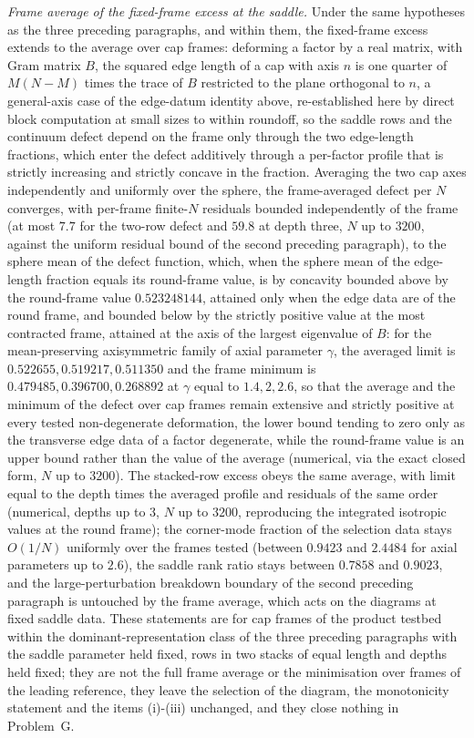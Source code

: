 \emph{Frame average of the fixed-frame excess at the saddle.} Under the same hypotheses as the three preceding paragraphs, and within them, the fixed-frame excess extends to the average over cap frames: deforming a factor by a real matrix, with Gram matrix \(B\), the squared edge length of a cap with axis \(n\) is one quarter of \(M(N-M)\) times the trace of \(B\) restricted to the plane orthogonal to \(n\), a general-axis case of the edge-datum identity above, re-established here by direct block computation at small sizes to within roundoff, so the saddle rows and the continuum defect depend on the frame only through the two edge-length fractions, which enter the defect additively through a per-factor profile that is strictly increasing and strictly concave in the fraction. Averaging the two cap axes independently and uniformly over the sphere, the frame-averaged defect per \(N\) converges, with per-frame finite-\(N\) residuals bounded independently of the frame (at most \(7.7\) for the two-row defect and \(59.8\) at depth three, \(N\) up to \(3200\), against the uniform residual bound of the second preceding paragraph), to the sphere mean of the defect function, which, when the sphere mean of the edge-length fraction equals its round-frame value, is by concavity bounded above by the round-frame value \(0.523248144\), attained only when the edge data are of the round frame, and bounded below by the strictly positive value at the most contracted frame, attained at the axis of the largest eigenvalue of \(B\): for the mean-preserving axisymmetric family of axial parameter \(\gamma\), the averaged limit is \(0.522655,0.519217,0.511350\) and the frame minimum is \(0.479485,0.396700,0.268892\) at \(\gamma\) equal to \(1.4,2,2.6\), so that the average and the minimum of the defect over cap frames remain extensive and strictly positive at every tested non-degenerate deformation, the lower bound tending to zero only as the transverse edge data of a factor degenerate, while the round-frame value is an upper bound rather than the value of the average (numerical, via the exact closed form, \(N\) up to \(3200\)). The stacked-row excess obeys the same average, with limit equal to the depth times the averaged profile and residuals of the same order (numerical, depths up to \(3\), \(N\) up to \(3200\), reproducing the integrated isotropic values at the round frame); the corner-mode fraction of the selection data stays \(O(1/N)\) uniformly over the frames tested (between \(0.9423\) and \(2.4484\) for axial parameters up to \(2.6\)), the saddle rank ratio stays between \(0.7858\) and \(0.9023\), and the large-perturbation breakdown boundary of the second preceding paragraph is untouched by the frame average, which acts on the diagrams at fixed saddle data. These statements are for cap frames of the product testbed within the dominant-representation class of the three preceding paragraphs with the saddle parameter held fixed, rows in two stacks of equal length and depths held fixed; they are not the full frame average or the minimisation over frames of the leading reference, they leave the selection of the diagram, the monotonicity statement and the items (i)-(iii) unchanged, and they close nothing in Problem~G.

